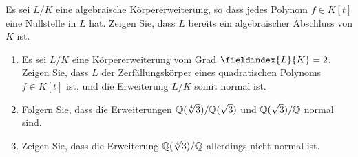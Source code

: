 \documentclass[a4paper, 10pt]{scrartcl}
\begin{document}

\begin{question}
  Es sei $L/K$ eine algebraische Körpererweiterung, so dass jedes Polynom $f \in K[t]$ eine Nullstelle in $L$ hat.
  Zeigen Sie, dass $L$ bereits ein algebraischer Abschluss von $K$ ist.
\end{question}

\begin{question}
  \begin{enumerate}
    \item
      Es sei $L/K$ eine Körpererweiterung vom Grad $\fieldindex{L}{K} = 2$.
      Zeigen Sie, dass $L$ der Zerfällungskörper eines quadratischen Polynoms $f \in K[t]$ ist, und die Erweiterung $L/K$ somit normal ist.
    \item
      Folgern Sie, dass die Erweiterungen $\mathbb{Q}(\sqrt[4]{3})/\mathbb{Q}(\sqrt{3})$ und $\mathbb{Q}(\sqrt{3})/\mathbb{Q}$ normal sind.
    \item
      Zeigen Sie, dass die Erweiterung $\mathbb{Q}(\sqrt[4]{3})/\mathbb{Q}$ allerdings nicht normal ist.
  \end{enumerate}
\end{question}
\end{document}
